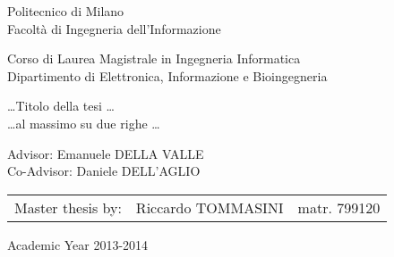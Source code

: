 \begin{titlepage}
\vspace*{-2.5cm}
\bfseries
\begin{center}
  \LARGE
  Politecnico di Milano\\
  \Large
  Facolt\`{a} di Ingegneria dell'Informazione\\


\begin{large}
Corso di Laurea Magistrale in Ingegneria Informatica\\
Dipartimento di Elettronica, Informazione e Bioingegneria\\
\end{large}

\vspace{1.0cm}
\begin{Large}
\dots Titolo della tesi \dots\\
\dots al massimo su due righe \dots
\end{Large}  
\end{center}
\vspace*{5.5cm}
\large
\begin{flushleft}
\hspace{-2cm}  Advisor: Emanuele DELLA VALLE\\
\hspace{-2cm}  Co-Advisor: Daniele DELL'AGLIO\\
\end{flushleft}
\vspace*{1.5cm}

\hspace{1.5cm}
\parbox{14cm}{
    \begin{tabular}{lll}
        Master thesis by: & Riccardo TOMMASINI     & matr. 799120\\
    \end{tabular}
}

\vspace*{1.4cm}
\begin{center}

  Academic Year 2013-2014



\end{center}
\end{titlepage}
\cleardoublepage

\thispagestyle{empty}

